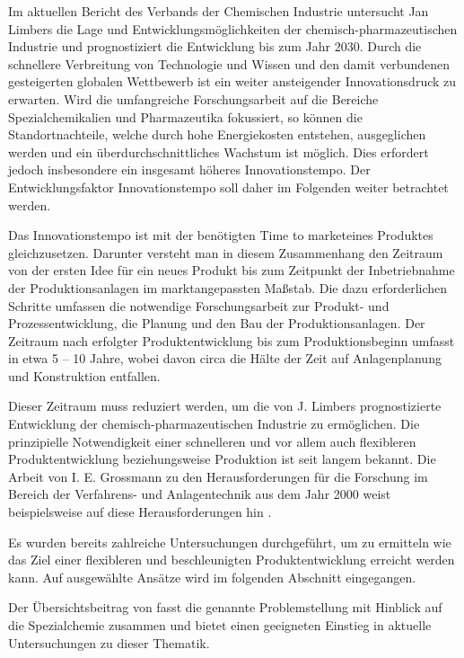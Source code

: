 Im aktuellen Bericht des Verbands der Chemischen Industrie  untersucht Jan Limbers die Lage und Entwicklungsm\"oglichkeiten der chemisch-pharmazeutischen Industrie und prognostiziert die Entwicklung bis zum Jahr 2030. Durch die schnellere Verbreitung von Technologie und Wissen und den damit verbundenen gesteigerten globalen Wettbewerb ist ein weiter ansteigender Innovationsdruck zu erwarten. Wird die umfangreiche Forschungsarbeit auf die Bereiche Spezialchemikalien und Pharmazeutika fokussiert, so k\"onnen die Standortnachteile, welche durch hohe Energiekosten entstehen, ausgeglichen werden und ein \"uberdurchschnittliches Wachstum ist m\"oglich. Dies erfordert jedoch insbesondere ein insgesamt h\"oheres Innovationstempo. Der Entwicklungsfaktor Innovationstempo soll daher im Folgenden weiter betrachtet werden. \cite{PerspektiveC_2016}

Das Innovationstempo ist mit der ben\"otigten \glqq Time to market\grqq { }eines Produktes gleichzusetzen. Darunter versteht man in diesem Zusammenhang den Zeitraum von der ersten Idee f\"ur ein neues Produkt bis zum Zeitpunkt der Inbetriebnahme der Produktionsanlagen im marktangepassten Ma\ss{}stab. Die dazu erforderlichen Schritte umfassen die notwendige Forschungsarbeit zur Produkt- und Prozessentwicklung, die Planung und den Bau der Produktionsanlagen. Der Zeitraum nach erfolgter Produktentwicklung bis zum Produktionsbeginn umfasst in etwa 5 -- 10 Jahre, wobei davon circa die H\"alte der Zeit auf Anlagenplanung und Konstruktion entfallen. \cite{Schembecker_2009}

Dieser Zeitraum muss reduziert werden, um die von J. Limbers prognostizierte Entwicklung der chemisch-pharmazeutischen Industrie zu erm\"oglichen. \newline
Die prinzipielle Notwendigkeit einer schnelleren und vor allem auch flexibleren Produktentwicklung beziehungsweise Produktion ist seit langem bekannt. Die Arbeit von I. E. Grossmann zu den Herausforderungen f\"ur die Forschung im Bereich der Verfahrens- und Anlagentechnik aus dem Jahr 2000 weist beispielsweise auf diese Herausforderungen hin \cite{Grossmann_2000}.

Es wurden bereits zahlreiche Untersuchungen durchgef\"uhrt, um zu ermitteln wie das Ziel einer flexibleren und  beschleunigten Produktentwicklung erreicht werden kann. Auf ausgew\"ahlte Ans\"atze wird im folgenden Abschnitt eingegangen.

Der \"Ubersichtsbeitrag von \citeauthor{Wachsen_2015} \cite{Wachsen_2015} fasst die genannte Problemstellung mit Hinblick auf die Spezialchemie zusammen und bietet einen geeigneten Einstieg in aktuelle Untersuchungen zu dieser Thematik. 

